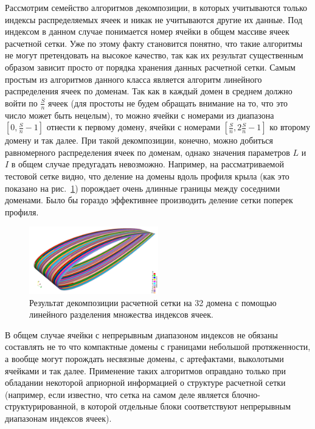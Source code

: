 Рассмотрим семейство алгоритмов декомпозиции, в которых учитываются только индексы распределяемых ячеек и никак не учитываются другие их данные.
Под индексом в данном случае понимается номер ячейки в общем массиве ячеек расчетной сетки.
Уже по этому факту становится понятно, что такие алгоритмы не могут претендовать на высокое качество, так как их результат существенным образом зависит просто от порядка хранения данных расчетной сетки.
Самым простым из алгоритмов данного класса является алгоритм линейного распределения ячеек по доменам.
Так как в каждый домен в среднем должно войти по $\frac{S}{n}$ ячеек (для простоты не будем обращать внимание на то, что это число может быть нецелым), то можно ячейки с номерами из диапазона $[0, \frac{S}{n} - 1]$ отнести к первому домену, ячейки с номерами $[\frac{S}{n}, 2\frac{S}{n} - 1]$ ко второму домену и так далее.
При такой декомпозиции, конечно, можно добиться равномерного распределения ячеек по доменам, однако значения параметров $L$ и $I$ в общем случае предугадать невозможно.
Например, на рассматриваемой тестовой сетке видно, что деление на домены вдоль профиля крыла (как это показано на рис.~\ref{fig:text_2_decompsurf_wing_linear_32}) порождает очень длинные границы между соседними доменами.
Было бы гораздо эффективнее производить деление сетки поперек профиля.

\begin{figure}[ht]
	\centering
	\includegraphics[width=0.5\textwidth]{./pics/text_2_decompsurf/wing_linear_32.png}
	\caption{Результат декомпозиции расчетной сетки на 32 домена с помощью линейного разделения множества индексов ячеек.}
	\label{fig:text_2_decompsurf_wing_linear_32}
\end{figure}

В общем случае ячейки с непрерывным диапазоном индексов не обязаны составлять не то что компактные домены с границами небольшой протяженности, а вообще могут порождать несвязные домены, с артефактами, выколотыми ячейками и так далее.
Применение таких алгоритмов оправдано только при обладании некоторой априорной информацией о структуре расчетной сетки (например, если известно, что сетка на самом деле является блочно-структурированной, в которой отдельные блоки соответствуют непрерывным диапазонам индексов ячеек).

